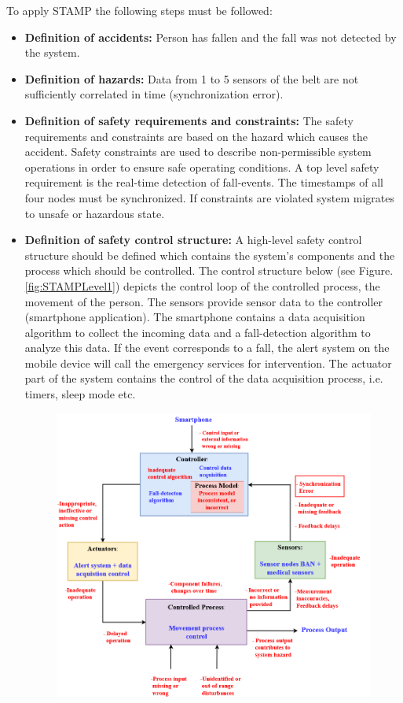 \documentclass[review]{elsarticle}
\begin{document}
To apply STAMP the following steps must be followed:

\begin{itemize}
	\item \textbf{Definition of accidents:} Person has fallen and the fall was not detected by the system.
	\item \textbf{Definition of hazards:} Data from 1 to 5 sensors of the belt are not sufficiently correlated in time (synchronization error).
	\item \textbf{Definition of safety requirements and constraints:} The safety requirements and constraints are based on the hazard which causes the accident. Safety constraints are used to describe non-permissible system operations in order to ensure safe operating conditions. A top level safety requirement is the real-time detection of fall-events. The timestamps of all four nodes must be synchronized. If constraints are violated system migrates to unsafe or hazardous state.
	\item \textbf{Definition of safety control structure:}
	A high-level safety control structure should be defined which contains the system's components and the process which should be controlled. The control structure below (see Figure. \ref{fig:STAMPLevel1}) depicts the control loop of the controlled process, the movement of the person.
	The sensors provide sensor data to the controller (smartphone application). The smartphone contains a data acquisition algorithm to collect the incoming data and a fall-detection algorithm to analyze this data. If the event corresponds to a fall, the alert system on the mobile device will call the emergency services for intervention. The actuator part of the system contains the control of the data acquisition process, i.e. timers, sleep mode etc.
	\begin{figure}[!ht]
		\centering
		\includegraphics[scale=0.36]{images/STAMP_SynchError}

\end{figure}
\end{itemize}
\end{document}
